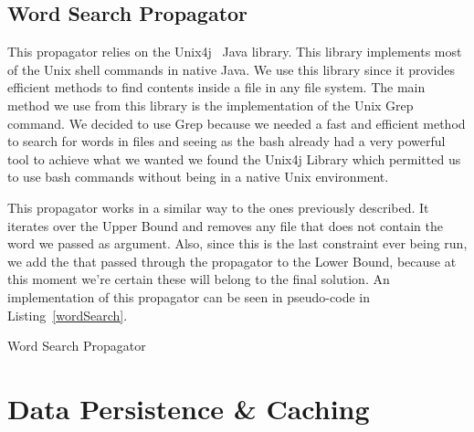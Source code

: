\subsection{Word Search Propagator}

This propagator relies on the Unix4j~\cite{Unix4j} Java library. This library implements most of the Unix shell commands in native Java. We use this library since it provides efficient methods to find contents inside a file in any file system. The main method we use from this library is the implementation of the Unix Grep command. We decided to use Grep because we needed a fast and efficient method to search for words in files and seeing as the bash already had a very powerful tool to achieve what we wanted we found the Unix4j Library which permitted us to use bash commands without being in a native Unix environment.

This propagator works in a similar way to the ones previously described. It iterates over the Upper Bound and removes any file that does not contain the word we passed as argument. Also, since this is the last constraint ever being run, we add the \INODES that passed through the propagator to the Lower Bound, because at this moment we're certain these will belong to the final solution. An implementation of this propagator can be seen in pseudo-code in Listing~\ref{wordSearch}.

\begin{algorithm}
    \caption{Word Search Propagator}
    \label{wordSearch}
    \begin{algorithmic}
                \Else
                    \Else
                    \EndIf
                \EndIf
            \EndIf        
        \EndFor
    \end{algorithmic}
\end{algorithm}

\section{Data Persistence \& Caching}
\label{dbcache}

